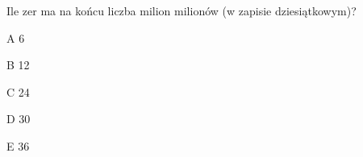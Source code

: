 \begin{tresc}
Ile zer ma na końcu liczba milion milionów (w zapisie dziesiątkowym)?
\end{tresc}
\begin{wariant}{A} 6 \end{wariant}
\begin{wariant}{B} 12 \end{wariant}
\begin{wariant}{C} 24 \end{wariant}
\begin{wariant}{D} 30 \end{wariant}
\begin{wariant}{E} 36 \end{wariant}
